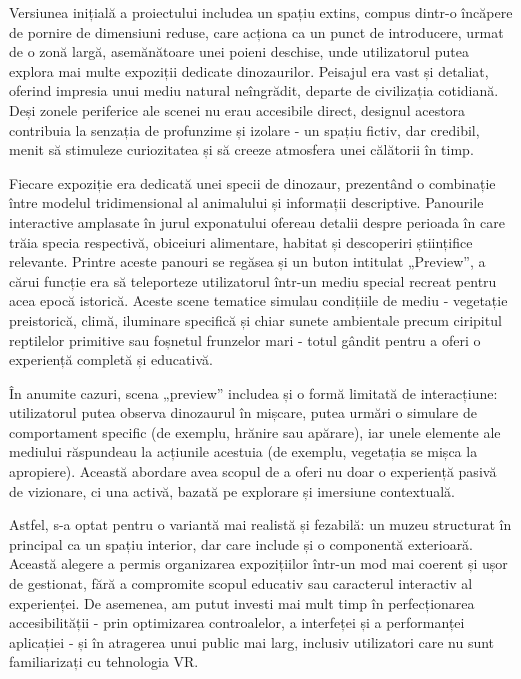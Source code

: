 Versiunea inițială a proiectului includea un spațiu extins, compus dintr-o încăpere de pornire de dimensiuni reduse, care acționa ca un punct de introducere, urmat de o zonă largă, asemănătoare unei poieni deschise, unde utilizatorul putea explora mai multe expoziții dedicate dinozaurilor. Peisajul era vast și detaliat, oferind impresia unui mediu natural neîngrădit, departe de civilizația cotidiană. Deși zonele periferice ale scenei nu erau accesibile direct, designul acestora contribuia la senzația de profunzime și izolare - un spațiu fictiv, dar credibil, menit să stimuleze curiozitatea și să creeze atmosfera unei călătorii în timp.

Fiecare expoziție era dedicată unei specii de dinozaur, prezentând o combinație între modelul tridimensional al animalului și informații descriptive. Panourile interactive amplasate în jurul exponatului ofereau detalii despre perioada în care trăia specia respectivă, obiceiuri alimentare, habitat și descoperiri științifice relevante. Printre aceste panouri se regăsea și un buton intitulat „Preview”, a cărui funcție era să teleporteze utilizatorul într-un mediu special recreat pentru acea epocă istorică. Aceste scene tematice simulau condițiile de mediu - vegetație preistorică, climă, iluminare specifică și chiar sunete ambientale precum ciripitul reptilelor primitive sau foșnetul frunzelor mari - totul gândit pentru a oferi o experiență completă și educativă.

În anumite cazuri, scena „preview” includea și o formă limitată de interacțiune: utilizatorul putea observa dinozaurul în mișcare, putea urmări o simulare de comportament specific (de exemplu, hrănire sau apărare), iar unele elemente ale mediului răspundeau la acțiunile acestuia (de exemplu, vegetația se mișca la apropiere). Această abordare avea scopul de a oferi nu doar o experiență pasivă de vizionare, ci una activă, bazată pe explorare și imersiune contextuală.

Astfel, s-a optat pentru o variantă mai realistă și fezabilă: un muzeu structurat în principal ca un spațiu interior, dar care include și o componentă exterioară. Această alegere a permis organizarea expozițiilor într-un mod mai coerent și ușor de gestionat, fără a compromite scopul educativ sau caracterul interactiv al experienței. De asemenea, am putut investi mai mult timp în perfecționarea accesibilității - prin optimizarea controalelor, a interfeței și a performanței aplicației - și în atragerea unui public mai larg, inclusiv utilizatori care nu sunt familiarizați cu tehnologia VR.

